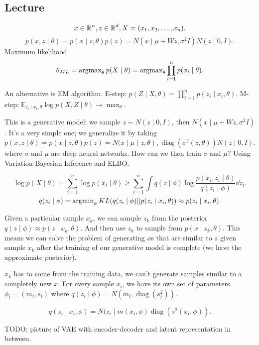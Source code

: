 \subsection{Lecture}

\[
x \in \operatorname{\mathbb{R}}^n, z \in \operatorname{\mathbb{R}}^d, X = (x_1, x_2, \ldots, x_n)
.\]
\[
p(x,z \mid \theta) = p(x \mid z, \theta) p(z) = N(x \mid \mu + Wz, \sigma^2 I) N(z \mid 0, I)
.\]
Maximum likelihood
\[
\theta_{ML} = \operatorname{argmax}_\theta p(X\mid \theta) = 
\operatorname{argmax}_\theta \prod_{i=1}^n p(x_i \mid \theta)
.\]

An alternative is EM algorithm.
E-step: $p(Z \mid X, \theta) =\prod_{i=1}^n p(z_i \mid x_i, \theta)$.
M-step: $\mathbb{E}_{z_i \mid x_i, \theta} \log p(X, Z \mid \theta) \to \max_{\theta}$.

This is a generative model: we sample $z \sim N(z \mid 0, I)$, then $N(x \mid \mu + Wz, \sigma^2 I)$.
It's a very simple one; we generalize it by taking 
\[
p(x,z \mid \theta) = p(x \mid z, \theta) p(z) = N(x \mid \mu(z, \theta), \operatorname{diag}(\sigma^2(z, \theta)) N(z \mid 0, I)
.\]
where $\sigma$ and $\mu$ are deep neural networks.
How can we then train $\sigma$ and $\mu$? Using Variation Bayesian Inference and ELBO.

\[
\log p(X \mid \theta) = \sum_{i=1}^{n} \log p(x_i \mid \theta) \ge
\sum_{i=1}^{n} \int q(z\mid \phi) \log \frac{p(x_i, z_i \mid \theta)}{q(z_i \mid \phi)} \dd z_i
.\]
\[
q(z_i \mid \phi) =
\operatorname{argmin}_{\phi} KL(q(z_i \mid \phi) || p(z_i \mid x_i, \theta)) \approx p(z_i \mid x_i, \theta)
.\]

Given a particular sample $x_k$, we can sample $z_k$ from the posterior $q(z \mid \phi) \approx p(z \mid x_k, \theta)$.
And then use $z_k$ to sample from $p(x\mid z_k, \theta)$.
This means we can solve the problem of generating $x$s that are similar to a given sample $x_k$ after the training of our generative model is complete (we have the approximate posterior).

$x_k$ has to come from the training data, we can't generate samples similar to a completely new $x$.
For every sample $x_i$, we have its own set of parameters $\phi_i = (m_i, s_i)$ where $q(z_i\mid \phi) = N(m_i, \operatorname{diag}(s_i^2))$.

\[
q(z_i \mid x_i, \phi) = N(z_i \mid m(x_i, \phi) \operatorname{diag}(s^2(x_i, \phi))
.\]

TODO: picture of VAE with encoder-decoder and latent representation in between.


